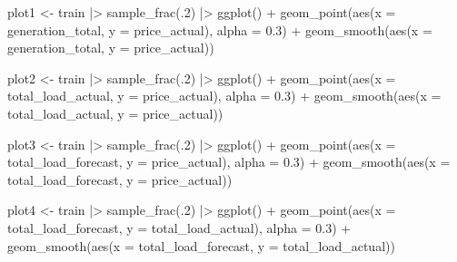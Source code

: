 \documentclass[
]{article}
\newenvironment{Shaded}{\begin{snugshade}}{\end{snugshade}}
\newcommand{\AttributeTok}[1]{\textcolor[rgb]{0.40,0.45,0.13}{#1}}
\newcommand{\DecValTok}[1]{\textcolor[rgb]{0.68,0.00,0.00}{#1}}
\newcommand{\FloatTok}[1]{\textcolor[rgb]{0.68,0.00,0.00}{#1}}
\newcommand{\FunctionTok}[1]{\textcolor[rgb]{0.28,0.35,0.67}{#1}}
\newcommand{\NormalTok}[1]{\textcolor[rgb]{0.00,0.23,0.31}{#1}}
\newcommand{\OtherTok}[1]{\textcolor[rgb]{0.00,0.23,0.31}{#1}}
\newcommand{\SpecialCharTok}[1]{\textcolor[rgb]{0.37,0.37,0.37}{#1}}
\begin{document}
\begin{Shaded}
\begin{Highlighting}[]
\NormalTok{plot1 }\OtherTok{\textless{}{-}}\NormalTok{ train }\SpecialCharTok{|\textgreater{}}
  \FunctionTok{sample\_frac}\NormalTok{(.}\DecValTok{2}\NormalTok{) }\SpecialCharTok{|\textgreater{}}
  \FunctionTok{ggplot}\NormalTok{() }\SpecialCharTok{+}
  \FunctionTok{geom\_point}\NormalTok{(}\FunctionTok{aes}\NormalTok{(}\AttributeTok{x =}\NormalTok{ generation\_total, }\AttributeTok{y =}\NormalTok{ price\_actual), }\AttributeTok{alpha =} \FloatTok{0.3}\NormalTok{) }\SpecialCharTok{+}
  \FunctionTok{geom\_smooth}\NormalTok{(}\FunctionTok{aes}\NormalTok{(}\AttributeTok{x =}\NormalTok{ generation\_total, }\AttributeTok{y =}\NormalTok{ price\_actual))}

\NormalTok{plot2 }\OtherTok{\textless{}{-}}\NormalTok{ train }\SpecialCharTok{|\textgreater{}}
  \FunctionTok{sample\_frac}\NormalTok{(.}\DecValTok{2}\NormalTok{) }\SpecialCharTok{|\textgreater{}}
  \FunctionTok{ggplot}\NormalTok{() }\SpecialCharTok{+}
  \FunctionTok{geom\_point}\NormalTok{(}\FunctionTok{aes}\NormalTok{(}\AttributeTok{x =}\NormalTok{ total\_load\_actual, }\AttributeTok{y =}\NormalTok{ price\_actual), }\AttributeTok{alpha =} \FloatTok{0.3}\NormalTok{) }\SpecialCharTok{+}
  \FunctionTok{geom\_smooth}\NormalTok{(}\FunctionTok{aes}\NormalTok{(}\AttributeTok{x =}\NormalTok{ total\_load\_actual, }\AttributeTok{y =}\NormalTok{ price\_actual))}

\NormalTok{plot3 }\OtherTok{\textless{}{-}}\NormalTok{ train }\SpecialCharTok{|\textgreater{}}
  \FunctionTok{sample\_frac}\NormalTok{(.}\DecValTok{2}\NormalTok{) }\SpecialCharTok{|\textgreater{}}
  \FunctionTok{ggplot}\NormalTok{() }\SpecialCharTok{+}
  \FunctionTok{geom\_point}\NormalTok{(}\FunctionTok{aes}\NormalTok{(}\AttributeTok{x =}\NormalTok{ total\_load\_forecast, }\AttributeTok{y =}\NormalTok{ price\_actual), }\AttributeTok{alpha =} \FloatTok{0.3}\NormalTok{) }\SpecialCharTok{+}
  \FunctionTok{geom\_smooth}\NormalTok{(}\FunctionTok{aes}\NormalTok{(}\AttributeTok{x =}\NormalTok{ total\_load\_forecast, }\AttributeTok{y =}\NormalTok{ price\_actual))}

\NormalTok{plot4 }\OtherTok{\textless{}{-}}\NormalTok{ train }\SpecialCharTok{|\textgreater{}}
  \FunctionTok{sample\_frac}\NormalTok{(.}\DecValTok{2}\NormalTok{) }\SpecialCharTok{|\textgreater{}}
  \FunctionTok{ggplot}\NormalTok{() }\SpecialCharTok{+}
  \FunctionTok{geom\_point}\NormalTok{(}\FunctionTok{aes}\NormalTok{(}\AttributeTok{x =}\NormalTok{ total\_load\_forecast, }\AttributeTok{y =}\NormalTok{ total\_load\_actual), }\AttributeTok{alpha =} \FloatTok{0.3}\NormalTok{) }\SpecialCharTok{+}
  \FunctionTok{geom\_smooth}\NormalTok{(}\FunctionTok{aes}\NormalTok{(}\AttributeTok{x =}\NormalTok{ total\_load\_forecast, }\AttributeTok{y =}\NormalTok{ total\_load\_actual))}


\end{Highlighting}
\end{Shaded}
\end{document}
